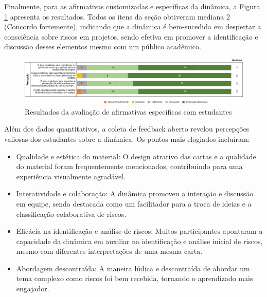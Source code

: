 \documentclass[
	12pt,
	openright,
	twoside,
	a4paper,
	english,
	brazil
	]{abntex2}
\begin{document}
Finalmente, para as afirmativas customizadas e específicas da dinâmica, a Figura \ref{ufsc-afirmativas} apresenta os resultados. Todos os itens da seção obtiveram mediana 2 (Concordo fortemente), indicando que a dinâmica é bem-sucedida em despertar a consciência sobre riscos em projetos, sendo efetiva em promover a identificação e discussão desses elementos mesmo com um público acadêmico.

\begin{figure}[H]
	\caption{\label{ufsc-afirmativas} Resultados da avaliação de afirmativas específicas com estudantes}
  \includegraphics[width=\textwidth]{ufsc-afirmativas}
\end{figure}

Além dos dados quantitativos, a coleta de feedback aberto revelou percepções valiosas dos estudantes sobre a dinâmica. Os pontos mais elogiados incluíram:
\begin{itemize}
  \item Qualidade e estética do material: O design atrativo das cartas e a qualidade do material foram frequentemente mencionados, contribuindo para uma experiência visualmente agradável.
  \item Interatividade e colaboração: A dinâmica promoveu a interação e discussão em equipe, sendo destacada como um facilitador para a troca de ideias e a classificação colaborativa de riscos.
  \item Eficácia na identificação e análise de riscos: Muitos participantes apontaram a capacidade da dinâmica em auxiliar na identificação e análise inicial de riscos, mesmo com diferentes interpretações de uma mesma carta.
  \item Abordagem descontraída: A maneira lúdica e descontraída de abordar um tema complexo como riscos foi bem recebida, tornando o aprendizado mais engajador.
\end{itemize}
\end{document}
